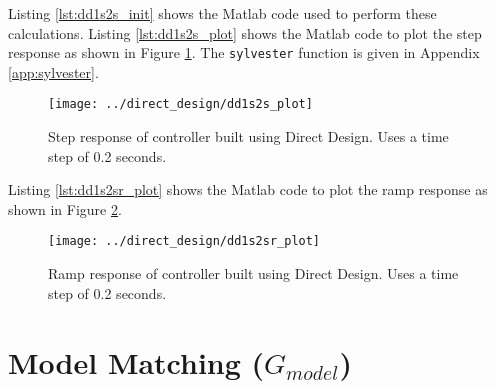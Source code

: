 \documentclass{article}
\newcommand{\sincludepdf}[2][]{
	
}
\begin{document}

\sincludepdf[pages=3,
			pagecommand=\subsection*{Example 2}
	]{scan/11251301.pdf}
\sincludepdf[pages=4-6]{scan/11251301.pdf}

Listing \ref{lst:dd1s2s_init} shows the Matlab code used to perform
these calculations.
Listing \ref{lst:dd1s2s_plot} shows the Matlab code to plot the step response
as shown in Figure \ref{fig:dd1s2s_plot}.
The \verb+sylvester+ function is given in Appendix \ref{app:sylvester}.



\clearpage


\begin{figure}
\begin{center}
\texttt{[image: ../direct\_design/dd1s2s\_plot]}
\end{center}
\caption{Step response of controller built
using Direct Design. Uses a time step of 0.2 seconds.}
\label{fig:dd1s2s_plot}
\end{figure}

\clearpage
Listing \ref{lst:dd1s2sr_plot} shows the Matlab code to plot the ramp response
as shown in Figure \ref{fig:dd1s2sr_plot}.



\begin{figure}
\begin{center}
\texttt{[image: ../direct\_design/dd1s2sr\_plot]}
\end{center}
\caption{Ramp response of controller built
using Direct Design. Uses a time step of 0.2 seconds.}
\label{fig:dd1s2sr_plot}
\end{figure}



\clearpage
\section{Model Matching ($G_{model}$)}
\label{sec:mm}
\end{document}
